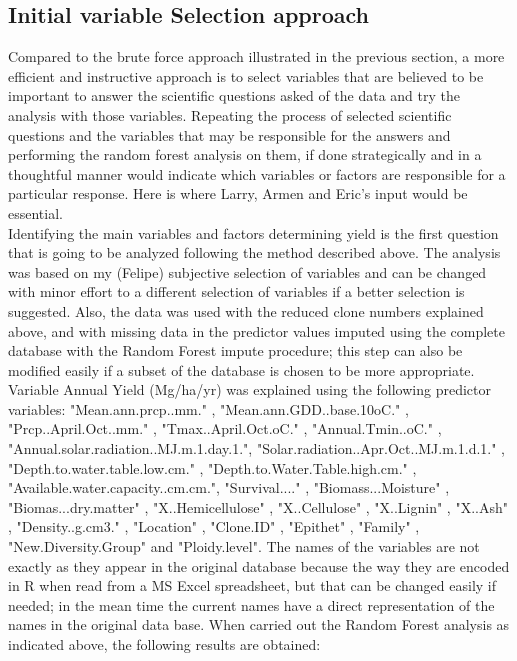 \documentclass{article}\usepackage[]{graphicx}\usepackage[]{color}
\begin{document}
\subsection*{Initial variable Selection approach}

Compared to the brute force approach illustrated in the previous section, a more efficient and instructive approach is to select variables that are believed to be important to answer the scientific questions asked of the data and try the analysis with those variables. Repeating the process of selected scientific questions and the variables that may be responsible for the answers and performing the random forest analysis on them, if done strategically and in a thoughtful manner would indicate which variables or factors are responsible for a particular response.
Here is where Larry, Armen and Eric's input would be essential.\\

Identifying the main variables and factors determining yield is the first question that is going to be analyzed following the method described above. The analysis was based on my (Felipe) subjective selection of variables and can be changed with minor effort to a different selection of variables if a better selection is suggested. Also, the data was used with the reduced clone numbers explained above, and with missing data in the predictor values imputed using the complete database  with the Random Forest impute procedure; this step can also be modified easily if a subset of the database is chosen to be more appropriate.\\

Variable Annual Yield (Mg/ha/yr) was explained using the following predictor variables: "Mean.ann.prcp..mm." , "Mean.ann.GDD..base.10oC." , "Prcp..April.Oct..mm." ,  "Tmax..April.Oct.oC." , "Annual.Tmin..oC." , "Annual.solar.radiation..MJ.m.1.day.1.", "Solar.radiation..Apr.Oct..MJ.m.1.d.1." , "Depth.to.water.table.low.cm." , "Depth.to.Water.Table.high.cm." , "Available.water.capacity..cm.cm.", "Survival...." , "Biomass...Moisture" , "Biomas...dry.matter" , "X..Hemicellulose" , "X..Cellulose" , "X..Lignin" , "X..Ash" , "Density..g.cm3." , "Location" , "Clone.ID" , "Epithet" , "Family" , "New.Diversity.Group" and "Ploidy.level". The names of the variables are not exactly as they appear in the original database because the way they are encoded in R when read from a MS Excel spreadsheet, but that can be changed easily if needed; in the mean time the current names have a direct representation of the names in the original data base. When carried out the Random Forest analysis as indicated above, the following results are obtained:
\end{document}
